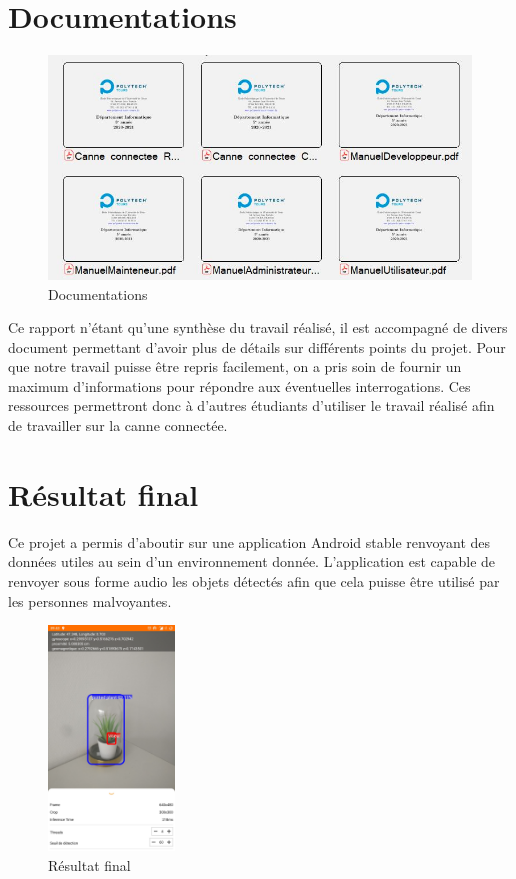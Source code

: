 \documentclass[UTF8]{EPURapport}
\begin{document}
\section{Documentations}

\begin{figure}[h!]
\centering
  \includegraphics[width=\textwidth]{images/docs.JPG}
  \caption{Documentations}
  \label{fig:docs}
\end{figure}

Ce rapport n'étant qu'une synthèse du travail réalisé, il est accompagné de divers document permettant d'avoir plus de détails sur différents points du projet. Pour que notre travail puisse être repris facilement, on a pris soin de fournir un maximum d'informations pour répondre aux éventuelles interrogations. Ces ressources permettront donc à d'autres étudiants d'utiliser le travail réalisé afin de travailler sur la canne connectée.

\section{Résultat final}

Ce projet a permis d'aboutir sur une application Android stable renvoyant des données utiles au sein d'un environnement donnée. L'application est capable de renvoyer sous forme audio les objets détectés afin que cela puisse être utilisé par les personnes malvoyantes. 

\begin{figure}[h!]
\centering
  \includegraphics[width=0.3\textwidth]{images/result.jpg}
  \caption{Résultat final}
  \label{fig:result}
\end{figure}
\end{document}
